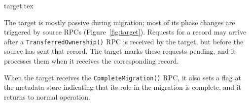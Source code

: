  {target.tex}

The target is mostly passive during migration; most of its phase changes are
triggered by source RPCs (Figure~\ref{fig:target}).
%
Requests for a record may arrive after a \texttt{TransferredOwnership()} RPC is received by the target, but before the
source has sent that record.
%
The target marks these requests pending, and it processes them when it receives
the corresponding record.

When the target receives the \texttt{CompleteMigration()} RPC,
%
it also sets a flag at the metadata store indicating that its role in the
migration is complete, and it returns to normal operation.

%

%

